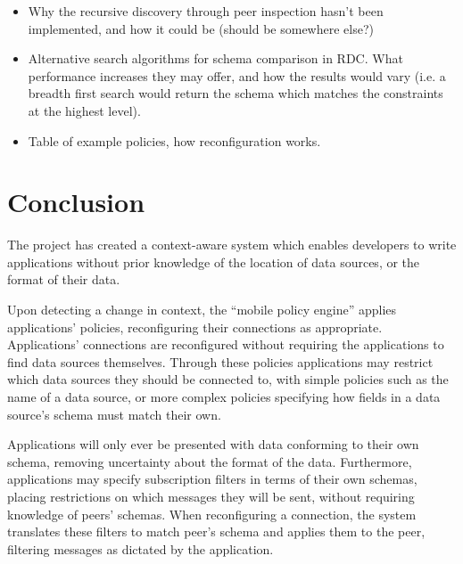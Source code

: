 \documentclass[12pt,twoside,notitlepage]{report}
\begin{document}
\begin{itemize}
\item Why the recursive discovery through peer inspection hasn't been implemented, and how it could be (should be somewhere else?)

\item Alternative search algorithms for schema comparison in RDC. What performance increases they may offer, and how the results would vary (i.e. a breadth first search would return the schema which matches the constraints at the highest level).

\item Table of example policies, how reconfiguration works.
\end{itemize}


\cleardoublepage

\chapter{Conclusion}

The project has created a context-aware system which enables developers to write applications without prior knowledge of the location of data sources, or the format of their data. 

Upon detecting a change in context, the ``mobile policy engine'' applies applications' policies, reconfiguring their connections as appropriate. 
Applications' connections are reconfigured without requiring the applications to find data sources themselves.
Through these policies applications may restrict which data sources they should be connected to, with simple policies such as the name of a data source, or more complex policies specifying how fields in a data source's schema must match their own.

Applications will only ever be presented with data conforming to their own schema, removing uncertainty about the format of the data.
Furthermore, applications may specify subscription filters in terms of their own schemas, placing restrictions on which messages they will be sent, without requiring knowledge of peers' schemas.
When reconfiguring a connection, the system translates these filters to match peer's schema and applies them to the peer, filtering messages as dictated by the application.
\end{document}

